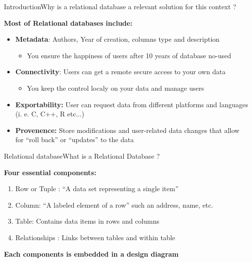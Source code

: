 \documentclass[table]{eecslides}
\begin{document}
\begin{frame}{Introduction}{Why is a relational database a relevant solution for this context ?}
	
	\textbf{Most of Relational databases include:}
	\begin{itemize}
		\item \alert{\textbf{Metadata}}: Authors, Year of creation, columns type and description
			\begin{itemize}
				\item You ensure the happiness of users after 10 years of database no-used
			\end{itemize}
		\item \alert{\textbf{Connectivity}}: Users can get a remote secure access to your own data
			\begin{itemize}
				\item You keep the control localy on your data and manage users
			\end{itemize}
		\item \alert{\textbf{Exportability:}} User can request data from different platforms and languages (i. e. C, C++, R etc...)
		\item \alert{\textbf{Provenence:}} Store modifications and user-related data changes that allow for “roll back” or “updates” to the data
	\end{itemize}


\end{frame}


\begin{frame}{Relational database}{What is a Relational Database ?}

\textbf{Four essential components:}
		 \begin{enumerate}
			 \item Row or Tuple : “A data set representing a single item” 
			\item Column: “A labeled element of a row” such an address, name, etc.
			\item Table: Contains data items in rows and columns
			\item Relationships : Links between tables and within table 
		 \end{enumerate}

	\textbf{Each components is embedded in a design diagram}

\end{frame}
\end{document}
